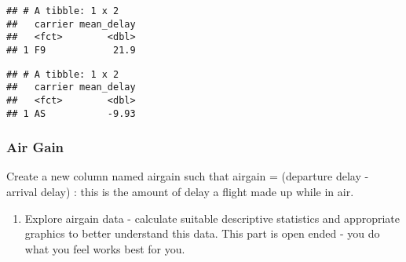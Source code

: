 \documentclass[
]{article}
\newenvironment{Shaded}{\begin{snugshade}}{\end{snugshade}}
\newcommand{\DataTypeTok}[1]{\textcolor[rgb]{0.13,0.29,0.53}{#1}}
\newcommand{\KeywordTok}[1]{\textcolor[rgb]{0.13,0.29,0.53}{\textbf{#1}}}
\newcommand{\NormalTok}[1]{#1}
\newcommand{\OperatorTok}[1]{\textcolor[rgb]{0.81,0.36,0.00}{\textbf{#1}}}
\newcommand{\StringTok}[1]{\textcolor[rgb]{0.31,0.60,0.02}{#1}}
\providecommand{\tightlist}{%
  \setlength{\itemsep}{0pt}\setlength{\parskip}{0pt}}
\begin{document}
\begin{Shaded}
\end{Shaded}

\begin{verbatim}
## # A tibble: 1 x 2
##   carrier mean_delay
##   <fct>        <dbl>
## 1 F9            21.9
\end{verbatim}

\begin{Shaded}
\end{Shaded}

\begin{verbatim}
## # A tibble: 1 x 2
##   carrier mean_delay
##   <fct>        <dbl>
## 1 AS           -9.93
\end{verbatim}

\hypertarget{air-gain}{%
\subsubsection{Air Gain}\label{air-gain}}

Create a new column named airgain such that airgain = (departure delay -
arrival delay) : this is the amount of delay a flight made up while in
air.

\begin{Shaded}
\end{Shaded}

\begin{enumerate}
\def\labelenumi{\alph{enumi})}
\tightlist
\item
  Explore airgain data - calculate suitable descriptive statistics and
  appropriate graphics to better understand this data. This part is open
  ended - you do what you feel works best for you.
\end{enumerate}
\end{document}

